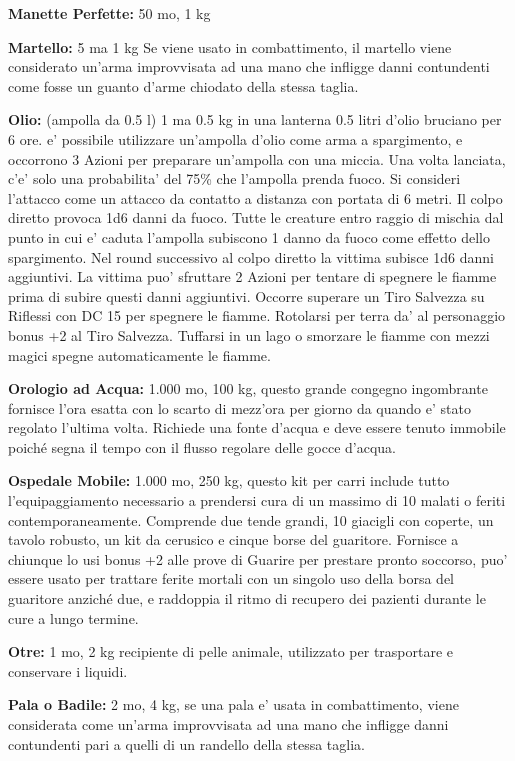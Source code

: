 \documentclass[a4paper,11pt,twoside,openany]{book}
\begin{document}
{\textbf{Manette Perfette:} 50 mo, 1 kg

\textbf{Martello:} 5 ma 1 kg Se viene usato in combattimento, il martello viene considerato un'arma improvvisata ad una mano che infligge danni contundenti come fosse un guanto d'arme chiodato della stessa taglia.

\textbf{Olio:} (ampolla da 0.5 l) 1 ma 0.5 kg in una lanterna 0.5 litri d'olio bruciano per 6 ore. e' possibile utilizzare un'ampolla d'olio come arma a spargimento, e occorrono 3 Azioni per preparare un'ampolla con una miccia. Una volta lanciata, c'e' solo una probabilita' del 75\% che l'ampolla prenda fuoco. Si consideri l'attacco come un attacco da contatto a distanza con portata di 6 metri. Il colpo diretto provoca 1d6 danni da fuoco. Tutte le creature entro raggio di mischia dal punto in cui e' caduta l'ampolla subiscono 1 danno da fuoco come effetto dello spargimento. Nel round successivo al colpo diretto la vittima subisce 1d6 danni aggiuntivi. La vittima puo' sfruttare 2 Azioni per tentare di spegnere le fiamme prima di subire questi danni aggiuntivi. Occorre superare un Tiro Salvezza su Riflessi con DC 15 per spegnere le fiamme. Rotolarsi per terra da' al personaggio bonus +2 al Tiro Salvezza. Tuffarsi in un lago o smorzare le fiamme con mezzi magici spegne automaticamente le fiamme.

\textbf{Orologio ad Acqua:} 1.000 mo, 100 kg, questo grande congegno ingombrante fornisce l'ora esatta con lo scarto di mezz'ora per giorno da quando e' stato regolato l'ultima volta. Richiede una fonte d'acqua e deve essere tenuto immobile poiché segna il tempo con il flusso regolare delle gocce d'acqua.

\textbf{Ospedale Mobile:} 1.000 mo, 250 kg, questo kit per carri include tutto l'equipaggiamento necessario a prendersi cura di un massimo di 10 malati o feriti contemporaneamente. Comprende due tende grandi, 10 giacigli con coperte, un tavolo robusto, un kit da cerusico e cinque borse del guaritore. Fornisce a chiunque lo usi bonus +2 alle prove di Guarire per prestare pronto soccorso, puo' essere usato per trattare ferite mortali con un singolo uso della borsa del guaritore anziché due, e raddoppia il ritmo di recupero dei pazienti durante le cure a lungo termine.

\textbf{Otre:} 1 mo, 2 kg recipiente di pelle animale, utilizzato per trasportare e conservare i liquidi.

\textbf{Pala o Badile:} 2 mo, 4 kg, se una pala e' usata in combattimento, viene considerata come un'arma improvvisata ad una mano che infligge danni contundenti pari a quelli di un randello della stessa taglia. 

}
\end{document}
